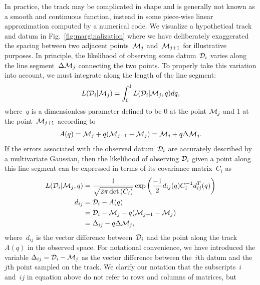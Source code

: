 \documentclass[foo.tex]{subfiles}
\begin{document}
In practice, the track may be complicated in shape and is generally not known
as a smooth and continuous function, instead in some piece-wise linear
approximation computed by a numerical code.
We visualize a hypothetical track and datum in Fig.~\ref{fig:marginalization}
where we have deliberately exaggerated the spacing between two adjacent
points~$\mathcal{M}_j$ and~$\mathcal{M}_{j + 1}$ for illustrative purposes.
In principle, the likelihood of observing some datum~$\mathcal{D}_i$ varies
along the line segment~$\Delta\mathcal{M}_j$ connecting the two points.
To properly take this variation into account, we must integrate along the
length of the line segment:
\begin{equation}
L(\mathcal{D}_i | \mathcal{M}_j) = \int_0^1 L(\mathcal{D}_i | \mathcal{M}_j, q) dq,
\label{eq:l_int_q}
\end{equation}
where~$q$ is a dimensionless parameter defined to be 0 at the point
$\mathcal{M}_j$ and 1 at the point~$\mathcal{M}_{j + 1}$ according to
\begin{equation}
A(q) = \mathcal{M}_j + q(\mathcal{M}_{j + 1} - \mathcal{M}_j)
= \mathcal{M}_j + q\Delta\mathcal{M}_j.
\end{equation}
If the errors associated with the observed datum~$\mathcal{D}_i$ are accurately
described by a multivariate Gaussian, then the likelihood of observing
$\mathcal{D}_i$ given a point along this line segment can be expressed in terms
of its covariance matrix~$C_i$ as
\begin{subequations}\begin{align}
L(\mathcal{D}_i | \mathcal{M}_j, q) &=
\frac{1}{\sqrt{2\pi \det{(C_i)}}}
\exp\left(\frac{-1}{2} d_{ij}(q) C_i^{-1} d_{ij}^T(q)\right)
\label{eq:l_di_mj_q}
\\
d_{ij} &= \mathcal{D}_i - A(q)
\\
&= \mathcal{D}_i - \mathcal{M}_j - q(\mathcal{M}_{j + 1} - \mathcal{M}_j)
\\
&= \Delta_{ij} - q\Delta \mathcal{M}_j,
\label{eq:delta_minus_qmj}
\end{align}\end{subequations}
where~$d_{ij}$ is the vector difference between~$\mathcal{D}_i$ and the
point along the track~$A(q)$ in the observed space.
For notational convenience, we have introduced the variable
$\Delta_{ij} = \mathcal{D}_i - \mathcal{M}_j$ as the vector difference between
the~$i$th datum and the~$j$th point sampled on the track.
We clarify our notation that the subscripts~$i$ and~$ij$ in equation
 above do not refer to rows and columns of matrices, but
\end{document}
